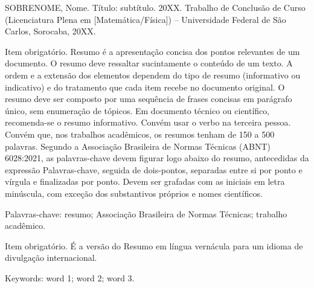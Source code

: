 
\begin{resumo} %
  SOBRENOME, Nome. Título: subtítulo. 20XX. Trabalho de Conclusão de Curso (Licenciatura Plena em [Matemática/Física]) -- Universidade Federal de São Carlos, Sorocaba, 20XX.
  \vspace*{\onelineskip}

  \begin{destaque}
  \end{destaque}

  Item obrigatório. Resumo é a apresentação concisa dos pontos relevantes de um documento. O resumo deve ressaltar sucintamente o conteúdo de um texto. A ordem e a extensão dos elementos dependem do tipo de resumo (informativo ou indicativo) e do tratamento que cada item recebe no documento original. O resumo deve ser composto por uma sequência de frases concisas em parágrafo único, sem enumeração de tópicos. Em documento técnico ou científico, recomenda-se o resumo informativo. Convém usar o verbo na terceira pessoa. Convém que, nos trabalhos acadêmicos, os resumos tenham de 150 a 500 palavras. Segundo a Associação Brasileira de Normas Técnicas (ABNT) 6028:2021, as palavras-chave devem figurar logo abaixo do resumo, antecedidas da expressão Palavras-chave, seguida de dois-pontos, separadas entre si por ponto e vírgula e finalizadas por ponto. Devem ser grafadas com as iniciais em letra minúscula, com exceção dos substantivos próprios e nomes científicos.
  \vspace{\onelineskip}

  \noindent
  Palavras-chave: resumo; Associação Brasileira de Normas Técnicas; trabalho acadêmico.
\end{resumo}

\cleardoublepage

\begin{resumo}[Abstract] %

  Item obrigatório. É a versão do Resumo em língua vernácula para um idioma de divulgação internacional.
  \vspace{\onelineskip}

  \noindent
  Keywords: word 1; word 2; word 3.
\end{resumo}

\cleardoublepage

